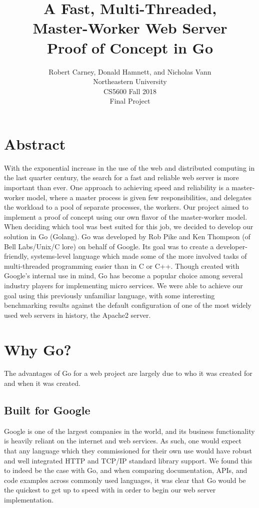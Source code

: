 \documentclass[10pt]{article}
\begin{document}
\title{
  A Fast, Multi-Threaded, \\
  Master-Worker Web Server \\
  \Large Proof of Concept in Go
}
  
\author{
  Robert Carney, Donald Hamnett, and Nicholas Vann \\
  Northeastern University \\
  CS5600 Fall 2018 \\
  Final Project 
}
\maketitle
\section*{Abstract}
\begin{multicols}{2}

\par
With the exponential increase in the use of the web and distributed computing in the last quarter century, the search for a fast and reliable web server is more important than ever.  One approach to achieving speed and reliability is a master-worker model, where a master process is given few responsibilities, and delegates the workload to a pool of separate processes, the workers.  Our project aimed to implement a proof of concept using our own flavor of the master-worker model.  When deciding which tool was best suited for this job, we decided to develop our solution in Go (Golang). Go was developed by Rob Pike and Ken Thompson (of Bell Labs/Unix/C lore) on behalf of Google.  Its goal was to create a developer-friendly, systems-level language which made some of the more involved tasks of multi-threaded programming easier than in C or C++.  Though created with Google's internal use in mind, Go has become a popular choice among several industry players for implementing micro services. We were able to achieve our goal using this previously unfamiliar language, with some interesting benchmarking results against the default configuration of one of the most widely used web servers in history, the Apache2 server.
\section*{Why Go?}
\par
The advantages of Go for a web project are largely due to who it was created for and when it was created.  
\subsection*{Built for Google}
\par
Google is one of the largest companies in the world, and its business functionality is heavily reliant on the internet and web services.  As such, one would expect that any language which they commissioned for their own use would have robust and well integrated HTTP and TCP/IP standard library support.  We found this to indeed be the case with Go, and when comparing documentation, APIs, and code examples across commonly used languages, it was clear that Go would be the quickest to get up to speed with in order to begin our web server implementation.  

\end{multicols}
\end{document}
